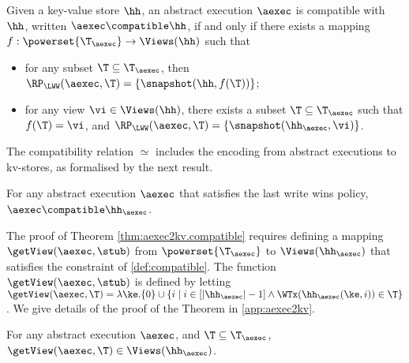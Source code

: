 \begin{definition}
\label{def:compatible}
Given a key-value store $\hh$,
an abstract execution $\aexec$ is compatible with $\hh$, written 
$\aexec \compatible \hh$, if and only if there exists a  mapping 
$f: \powerset{\T_{\aexec}} \rightarrow \Views(\hh)$
such that  
\begin{itemize}
\item for any subset $\T \subseteq \T_{\aexec}$, then $\RP_{\LWW}(\aexec, \T) = \{\snapshot(\hh, f(\T))\}$; 
\item for any view $\vi \in \Views(\hh)$, there exists a subset $\T \subseteq \T_{\aexec}$ 
such that $f(\T) = \vi$, and $\RP_{\LWW}(\aexec, \T) = \{\snapshot(\hh_{\aexec}, \vi)\}$.
\end{itemize}
\end{definition}

The compatibility relation $\simeq$ includes the encoding from abstract executions to kv-stores, 
as formalised by the next result.
\begin{theorem}
\label{thm:aexec2kv.compatible}
For any abstract execution $\aexec$ that satisfies the last write wins policy, $\aexec \compatible \hh_{\aexec}$.
\end{theorem}

The proof of Theorem \ref{thm:aexec2kv.compatible} requires defining a mapping 
$\getView(\aexec, \stub)$ from $\powerset{\T_{\aexec}}$ to $\Views(\hh_{\aexec})$ 
that satisfies the constraint of \cref{def:compatible}.
The function $\getView(\aexec, \stub)$ is defined by letting 
$\getView(\aexec, \T) = \lambda \ke. \{0\} \cup \{ i \mid i \in [\lvert \hh_{\aexec} \rvert - 1] \wedge 
\WTx(\hh_{\aexec}(\ke, i)) \in \T\}$.
We give details of the proof of the Theorem in \cref{app:aexec2kv}.
\begin{proposition}
\label{prop:getview.valid}
For any abstract execution $\aexec$, and $\T \subseteq \T_{\aexec}$, 
$\getView(\aexec, \T) \in \Views(\hh_{\aexec})$.
\end{proposition}

